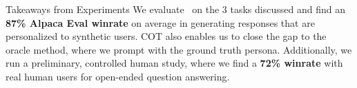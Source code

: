 \begin{AIbox}{Takeaways from Experiments}
We evaluate \methodname\ on the 3 tasks discussed and find an \textbf{87\% Alpaca Eval winrate} on average in generating responses that are personalized to synthetic users. COT also enables us to close the gap to the oracle method, where we prompt with the ground truth persona. Additionally, we run a preliminary, controlled human study, where we find a \textbf{72\% winrate} with real human users for open-ended question answering.
\end{AIbox}

